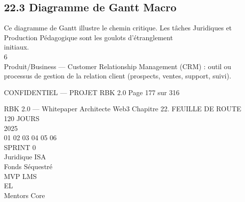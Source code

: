 \documentclass[12pt,landscape,a4paper]{article}
\newenvironment{confidential}
{\begin{tcolorbox}[
    colback=rbkred!5!white,
    colframe=rbkred!75!black,
    title=CONFIDENTIEL,
    fonttitle=\bfseries\color{white},
    coltitle=rbkred!75!black,
    breakable,
    enhanced,
    frame hidden,
    borderline west={2pt}{0pt}{rbkred!75!black}
]}
{\end{tcolorbox}}
\begin{document}
\subsection{22.3 Diagramme de Gantt Macro}
Ce diagramme de Gantt illustre le chemin critique. Les tâches Juridiques et Production Pédagogique sont les goulots d’étranglement\\
initiaux.\\
6\\
Produit/Business — Customer Relationship Management (CRM) : outil ou processus de gestion de la relation client (prospects, ventes, support, suivi).\\
\vspace{0.5em}
\vspace{0.5em}
\vspace{0.5em}
\vspace{0.5em}
\begin{confidential}CONFIDENTIEL — PROJET RBK 2.0                                            Page 177 sur 316\end{confidential}
RBK 2.0 — Whitepaper Architecte Web3                                             Chapitre 22. FEUILLE DE ROUTE 120 JOURS\\
\vspace{0.5em}
\vspace{0.5em}
\vspace{0.5em}
2025\\
\vspace{0.5em}
01    02               03            04                 05           06\\
\vspace{0.5em}
\vspace{0.5em}
SPRINT 0\\
\vspace{0.5em}
Juridique ISA\\
\vspace{0.5em}
Fonds Séquestré\\
\vspace{0.5em}
MVP LMS\\
\vspace{0.5em}
\vspace{0.5em}
\vspace{0.5em}
\vspace{0.5em}
EL\\
Mentors Core\\
\vspace{0.5em}
\vspace{0.5em}
\vspace{0.5em}
\end{document}
